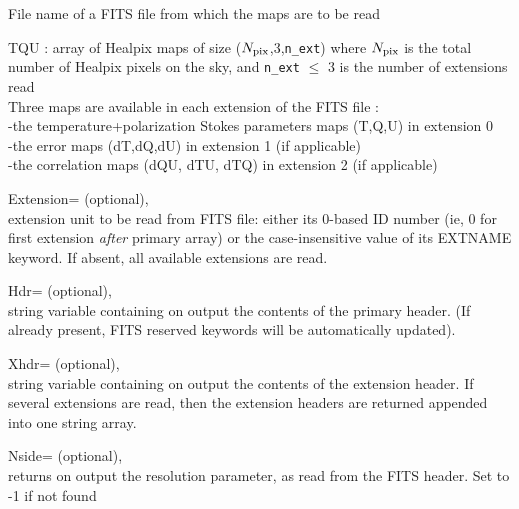 \begin{qualifiers}
  \begin{qulist}{} %
 	\item[{File}] 
          name of a FITS file from which the maps are to be read

   \item[{TQU}] : 
array of Healpix maps of size ($N_{\rm pix}$,3,{\tt n\_ext}) where $N_{\rm pix}$ is the total
   number of Healpix pixels on the sky, and {\tt n\_ext} $\le$ 3 is
   the number of extensions read\\
     Three maps are available in each extension of the FITS file : \\
      -the temperature+polarization Stokes parameters maps (T,Q,U) in
   extension 0 \\
      -the error maps (dT,dQ,dU) in extension 1 (if applicable)\\
      -the correlation maps (dQU, dTU, dTQ) in extension 2 (if applicable)

       \item[{Extension=}] 
		(optional), \\
	extension unit to be read from FITS file: 
 either its 0-based ID number (ie, 0 for first extension {\em after} primary array) 
 or the case-insensitive value of its EXTNAME keyword.
	If absent, all available extensions are read.

       \item[{Hdr=}] 
		  (optional), \\
		string variable containing on output  the contents of the primary header. (If already present, FITS reserved
		  keywords will be automatically updated).

       \item[{Xhdr=}] 
		  (optional), \\
		string variable containing on output the contents of the
		  extension header. If 
                  several extensions are read, then the extension 
                  headers are returned appended into one string array.

	 \item[{Nside=}] 
		(optional), \\
	        returns on output the \healpix resolution parameter, as read
		from the FITS header. Set to -1 if not found


\end{qulist}
\end{qualifiers}
